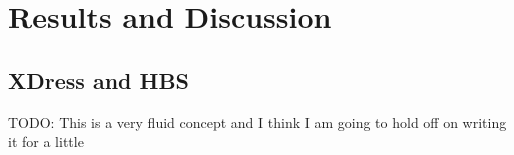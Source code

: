 
\section{Results and Discussion} \label{sec:results_and_discussion}

\subsection{XDress and HBS} \label{sub:xdress_and_hbs}

TODO: This is a very fluid concept and I think I am going to hold off on writing it for a little

